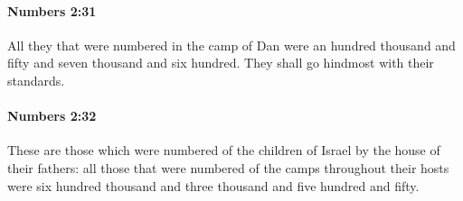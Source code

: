 		\paragraph{Numbers 2:31} %
			\label{NUMBERS-2-31}

			All they that were numbered in the camp of Dan were an hundred thousand and fifty and seven thousand and six hundred. They shall go hindmost with their standards.


		\paragraph{Numbers 2:32} %
			\label{NUMBERS-2-32}

			These are those which were numbered of the children of Israel by the house of their fathers: all those that were numbered of the camps throughout their hosts were six hundred thousand and three thousand and five hundred and fifty.

